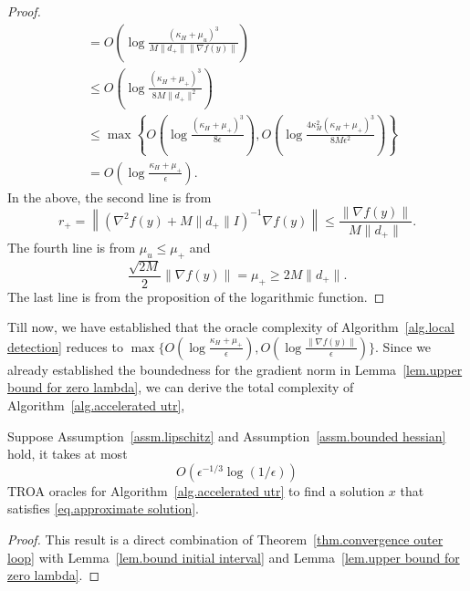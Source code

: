 \documentclass{mcom-l}
\numberwithin{equation}{section}
\begin{document}
\begin{proof}
\begin{equation*}
\begin{aligned}
                                                                & = O\left(\log\frac{(\kappa_H+\mu_u)^3}{M\|d_+\|\|\nabla f(y)\|}\right)                                                                                \\
                                                                & \leq O\left(\log\frac{(\kappa_H+\mu_+)^3}{8M\|d_+\|^2}\right)                                                                                         \\
                                                                & \leq  \max \left\{O\left(\log\frac{(\kappa_H+\mu_+)^3}{8\epsilon}\right),O\left(\log\frac{4\kappa_H^2(\kappa_H+\mu_+)^3}{8M\epsilon^2}\right)\right\} \\
                                                                & = O\left(\log\frac{\kappa_H+\mu_+}{\epsilon}\right).
        \end{aligned}
    \end{equation*}
    In the above, the second line is from
    $$r_+ = \left\|\left(\nabla^2 f(y)+M\|d_+\|I\right)^{-1} \nabla f(y)\right\| \leq \frac{\|\nabla f(y)\|}{M\|d_+\|}.$$
    The fourth line is from $\mu_u \leq \mu_+$ and
    $$
        \frac{\sqrt{2M}}{2}\|\nabla f(y)\| =\mu_+ \geq 2M\|d_+\|.
    $$
    The last line is from the proposition of the logarithmic function.
\end{proof}

Till now, we have established that the oracle complexity of Algorithm~\ref{alg.local detection} reduces to $\max\{O\left(\log\frac{\kappa_H+\mu_+}{\epsilon}\right),O\left(\log \frac{\|\nabla f(y)\|}{\epsilon}\right)\}$. Since we already established the boundedness for the gradient norm in Lemma~\ref{lem.upper bound for zero lambda}, we can derive the total complexity of Algorithm~\ref{alg.accelerated utr},
\begin{theorem}
    \label{thm.total complexity newton}
    Suppose Assumption~\ref{assm.lipschitz} and Assumption~\ref{assm.bounded hessian} hold, it takes at most
    \begin{equation}\label{eq.total complexity newton}
        O\left (\epsilon^{-1/3}\log \left(1/\epsilon\right)\right)
    \end{equation}
    TROA oracles for Algorithm~\ref{alg.accelerated utr} to find a solution $x$ that satisfies \eqref{eq.approximate solution}.
\end{theorem}
\begin{proof}
    This result is a direct combination of Theorem~\ref{thm.convergence outer loop} with Lemma~\ref{lem.bound initial interval} and Lemma~\ref{lem.upper bound for zero lambda}.
\end{proof}
\end{document}

